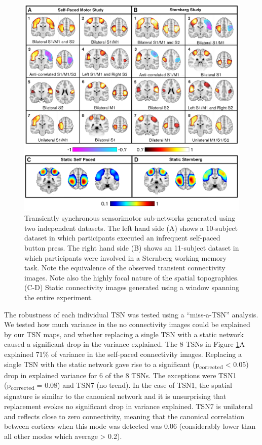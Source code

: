 	\begin{figure}[h]
		\begin{center}
			\includegraphics[width=\linewidth]{./images/chapter5/Figure_3.png}
			\caption{Transiently synchronous sensorimotor sub-networks generated using two independent datasets. The left hand side (A) shows a 10-subject dataset in which participants executed an infrequent self-paced button press. The right hand side (B) shows an 11-subject dataset in which participants were involved in a Sternberg working memory task. Note the equivalence of the observed transient connectivity images. Note also the highly focal nature of the spatial topographies. (C-D)  Static connectivity images generated using a window spanning the entire experiment. \label{figure_5_3}}
		\end{center}
	\end{figure}

The robustness of each individual TSN was tested using a “miss-a-TSN” analysis. We tested how much variance in the no connectivity images could be explained by our TSN maps, and whether replacing a single TSN with a static network caused a significant drop in the variance explained. The 8 TSNs in Figure \ref{figure_5_3}A explained  71\% of variance in the self-paced connectivity images. Replacing a single TSN with the static network gave rise to a significant (p\textsubscript{corrected} < 0.05) drop in explained variance for 6 of the 8 TSNs. The exceptions were TSN1 (p\textsubscript{corrected} = 0.08) and TSN7 (no trend). In the case of TSN1, the spatial signature is similar to the canonical network and it is unsurprising that replacement evokes no significant drop in variance explained. TSN7 is unilateral and reflects close to zero connectivity, meaning that the canonical correlation between cortices when this mode was detected was 0.06 (considerably lower than all other modes which average > 0.2). 

